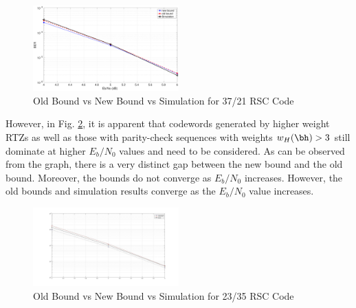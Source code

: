 \begin{figure}[h!]
\centering
		\includegraphics[width=0.5\textwidth]{./Images/RSC_37_21_v2.eps}
		\caption{Old Bound vs New Bound vs Simulation for 37/21 RSC Code}
		\label{simFig2}
		\end{figure}
However, in Fig. \ref{simFig3}, it is apparent that codewords generated by higher weight RTZs as well as those with parity-check sequences with weights $w_H(\bh)>3$ still dominate at higher $E_b/N_0$ values and need to be considered. As can be observed from the graph, there is a very distinct gap between the new bound and the old bound. Moreover, the bounds do not converge as $E_b/N_0$ increases. However, the old bounds and simulation results converge as the $E_b/N_0$ value increases. 

\begin{figure}[h!]
\centering
		\includegraphics[width=0.5\textwidth]{./Images/RSC_23_35_v3.jpg}
		\caption{Old Bound vs New Bound vs Simulation for 23/35 RSC Code}
		\label{simFig3}
		\end{figure}
		

